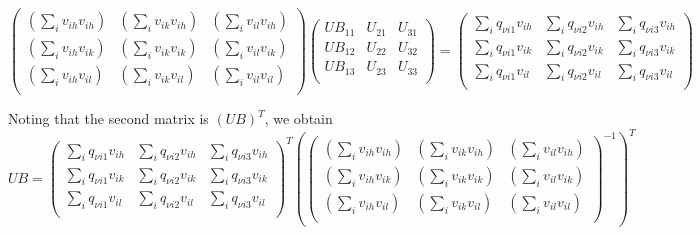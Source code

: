 \documentclass[prb]{revtex4}%
\begin{document}
\begin{equation}\label{UBintermediarystep}
    \left(
      \begin{array}{ccc}
        \left(\sum_{i} v_{ih}v_{ih}\right) & \left(\sum_{i} v_{ik}v_{ih}\right) & \left(\sum_{i} v_{il}v_{ih}\right) \\
        \left(\sum_{i} v_{ih}v_{ik}\right) & \left(\sum_{i} v_{ik}v_{ik}\right) & \left(\sum_{i} v_{il}v_{ik}\right) \\
        \left(\sum_{i} v_{ih}v_{il}\right) & \left(\sum_{i} v_{ik}v_{il}\right) & \left(\sum_{i} v_{il}v_{il}\right) \\
      \end{array}
    \right)
    \left(
      \begin{array}{ccc}
        UB_{11} & U_{21} & U_{31} \\
        UB_{12} & U_{22} & U_{32}\\
        UB_{13} & U_{23} & U_{33}\\
      \end{array}
    \right)
    =\left(
       \begin{array}{ccc}
         \sum_{i} q_{\nu i 1} v_{ih} & \sum_{i} q_{\nu i 2} v_{ih} &\sum_{i} q_{\nu i 3} v_{ih} \\
         \sum_{i} q_{\nu i 1} v_{ik} & \sum_{i} q_{\nu i 2} v_{ik} &\sum_{i} q_{\nu i 3} v_{ik}\\
         \sum_{i} q_{\nu i 1} v_{il} & \sum_{i} q_{\nu i 2} v_{il} &\sum_{i} q_{\nu i 3} v_{il}\\
       \end{array}
     \right)
\end{equation}

Noting that the second matrix is $(UB)^T$, we obtain
\begin{equation}
   UB=
    \left(
       \begin{array}{ccc}
         \sum_{i} q_{\nu i 1} v_{ih} & \sum_{i} q_{\nu i 2} v_{ih} &\sum_{i} q_{\nu i 3} v_{ih} \\
         \sum_{i} q_{\nu i 1} v_{ik} & \sum_{i} q_{\nu i 2} v_{ik} &\sum_{i} q_{\nu i 3} v_{ik}\\
         \sum_{i} q_{\nu i 1} v_{il} & \sum_{i} q_{\nu i 2} v_{il} &\sum_{i} q_{\nu i 3} v_{il}\\
       \end{array}
     \right)^T\left(\left(
      \begin{array}{ccc}
        \left(\sum_{i} v_{ih}v_{ih}\right) & \left(\sum_{i} v_{ik}v_{ih}\right) & \left(\sum_{i} v_{il}v_{ih}\right) \\
        \left(\sum_{i} v_{ih}v_{ik}\right) & \left(\sum_{i} v_{ik}v_{ik}\right) & \left(\sum_{i} v_{il}v_{ik}\right) \\
        \left(\sum_{i} v_{ih}v_{il}\right) & \left(\sum_{i} v_{ik}v_{il}\right) & \left(\sum_{i} v_{il}v_{il}\right) \\
      \end{array}
    \right)^{-1}\right)^T
\end{equation}
\end{document}
